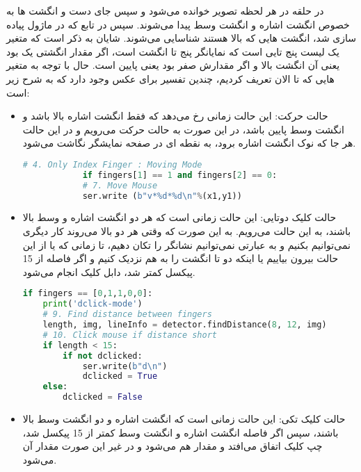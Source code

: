\documentclass{article}
\begin{document}
در حلقه در هر لحظه تصویر خوانده می‌شود و سپس جای دست و انگشت ها به خصوص انگشت اشاره و انگشت وسط پیدا می‌شوند. سپس در تابع  که در ماژول  پیاده سازی شد، انگشت هایی که بالا هستند شناسایی می‌شوند. شایان به ذکر است که متغیر  یک لیست پنج تایی است که نمایانگر پنج تا انگشت است، اگر مقدار انگشتی یک بود یعنی آن انگشت بالا و اگر مقدارش صفر بود یعنی پایین است. حال با توجه به متغیر هایی که تا الان تعریف کردیم، چندین تفسیر برای عکس وجود دارد که به شرح زیر است:

\begin{itemize}
	\item حالت حرکت:
	این حالت زمانی رخ می‌دهد که فقط انگشت اشاره بالا باشد و انگشت وسط پایین باشد، در این صورت به حالت حرکت می‌رویم و در این حالت هر جا که نوک انگشت اشاره برود، به نقطه ای در صفحه 
	نمایشگر نگاشت می‌شود.
\begin{latin}
\begin{lstlisting}[language=python]
		# 4. Only Index Finger : Moving Mode
    		if fingers[1] == 1 and fingers[2] == 0:
        	# 7. Move Mouse
        	ser.write (b"v*%d*%d\n"%(x1,y1))
\end{lstlisting}
\end{latin}
	
	\item حالت کلیک دوتایی:
	این حالت زمانی است که هر دو انگشت اشاره و وسط بالا باشند، به این حالت می‌رویم. به این صورت که وقتی هر دو بالا می‌روند کار دیگری نمی‌توانیم بکنیم و به عبارتی نمی‌توانیم نشانگر را تکان دهیم، تا زمانی که یا از این حالت بیرون بیاییم یا اینکه دو تا انگشت را به هم نزدیک کنیم و اگر فاصله از 15 پیکسل کمتر شد، دابل کلیک انجام می‌شود.
	
\begin{latin}
\begin{lstlisting}[language=python]
if fingers == [0,1,1,0,0]:
    print('dclick-mode')
    # 9. Find distance between fingers
    length, img, lineInfo = detector.findDistance(8, 12, img)
    # 10. Click mouse if distance short
    if length < 15:
        if not dclicked:
            ser.write(b"d\n")
            dclicked = True
    else:
        dclicked = False
\end{lstlisting}	
\end{latin}
	\item حالت کلیک تکی:
	این حالت زمانی است که انگشت اشاره و دو انگشت وسط بالا باشند، سپس اگر فاصله انگشت اشاره و انگشت وسط کمتر از 15 پیکسل شد، چپ کلیک اتفاق می‌افتد و مقدار  هم  می‌شود و در غیر این صورت مقدار آن  می‌شود.	
	

\end{itemize}
\end{document}
